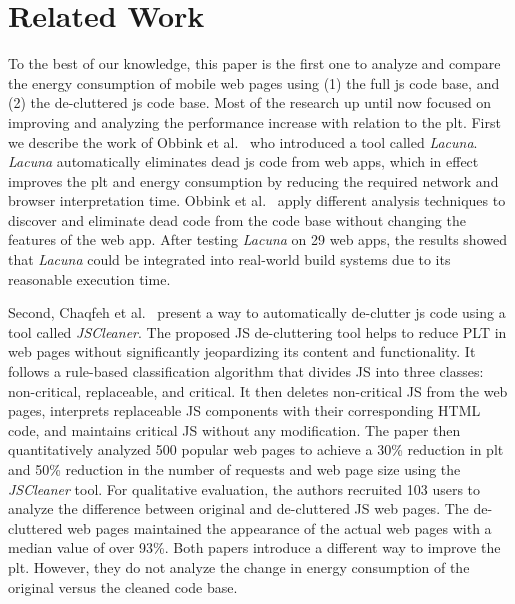 

\section{Related Work}\label{sec:related}

To the best of our knowledge, this paper is the first one to analyze and compare the energy consumption of mobile web pages using (1) the full \acrfull{js} code base, and (2) the de-cluttered \acrshort{js} code base. Most of the research up until now focused on improving and analyzing the performance increase with relation to the \acrfull{plt}. 
First we describe the work of Obbink et al.~\cite{Lacuna} who introduced a tool called \textit{Lacuna}. \textit{Lacuna} automatically eliminates dead \acrshort{js} code from web apps, which in effect improves the \acrshort{plt} and energy consumption by reducing the required network and browser interpretation time. Obbink et al.~\cite{Lacuna} apply different analysis techniques to discover and eliminate dead code from the code base without changing the features of the web app. After testing \textit{Lacuna} on 29 web apps, the results showed that \textit{Lacuna} could be integrated into real-world build systems due to its reasonable execution time. 

Second, Chaqfeh et al.~\cite{chaqfeh2020jscleaner} present a way to automatically de-clutter \acrshort{js} code using a tool called \textit{JSCleaner}. The proposed JS de-cluttering tool helps to reduce PLT in web pages without significantly jeopardizing its content and functionality. It follows a rule-based classification algorithm that divides JS into three classes: non-critical, replaceable, and critical. It then deletes non-critical JS from the web pages, interprets replaceable JS components with their corresponding HTML code, and maintains critical JS without any modification. The paper then quantitatively analyzed 500 popular web pages to achieve a 30\% reduction in \acrshort{plt} and 50\% reduction in the number of requests and web page size using the \textit{JSCleaner} tool. For qualitative evaluation, the authors recruited 103 users to analyze the difference between original and de-cluttered JS web pages. The de-cluttered web pages maintained the appearance of the actual web pages with a median value of over 93\%. Both papers \cite{Lacuna, chaqfeh2020jscleaner} introduce a different way to improve the \acrshort{plt}. However, they do not analyze the change in energy consumption of the original versus the cleaned code base. 

